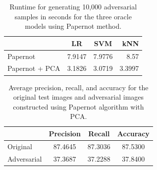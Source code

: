 \begin{table}[t]
	\caption{Runtime for generating 10,000 adversarial samples in seconds for the three oracle models using Papernot method.}
	\label{runtime_Papernot}
	\vskip 0.15in
	\begin{center}
		\begin{small}
			\begin{sc}
				\begin{tabular}{lccr}
					\hline
					\abovespace\belowspace
					&LR & SVM & kNN\\
					\hline
					\abovespace
					Papernot & 7.9147 & 7.9776 & 8.57\\
					Papernot + PCA & 3.1826 & 3.0719 & 3.3997\\				
					\hline
				\end{tabular}
			\end{sc}
		\end{small}
	\end{center}
	\vskip -0.1in
\end{table}

\begin{table}[t]
	\caption{Average precision, recall, and accuracy for the original test images and adversarial images constructed using Papernot algorithm with PCA.}
	\label{tablewithstuff}
	\vskip 0.15in
	\begin{center}
		\begin{small}
			\begin{sc}
				\begin{tabular}{lccc}
					\hline
					\abovespace\belowspace
					&Precision & Recall & Accuracy\\
					\hline
					\abovespace
					Original & 87.4645 &  87.3036  & 87.5300 \\
					Adversarial & 37.3687 &  37.2288 &  37.8400\\				
					\hline
				\end{tabular}
			\end{sc}
		\end{small}
	\end{center}
	\vskip -0.1in
\end{table}

